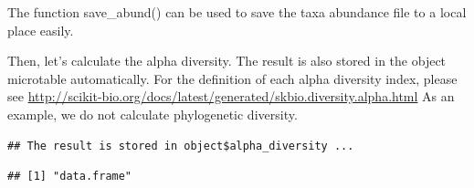 \documentclass[
]{book}
\newenvironment{Shaded}{\begin{snugshade}}{\end{snugshade}}
\newcommand{\AttributeTok}[1]{\textcolor[rgb]{0.77,0.63,0.00}{#1}}
\newcommand{\CommentTok}[1]{\textcolor[rgb]{0.56,0.35,0.01}{\textit{#1}}}
\newcommand{\ConstantTok}[1]{\textcolor[rgb]{0.00,0.00,0.00}{#1}}
\newcommand{\FunctionTok}[1]{\textcolor[rgb]{0.00,0.00,0.00}{#1}}
\newcommand{\NormalTok}[1]{#1}
\newcommand{\SpecialCharTok}[1]{\textcolor[rgb]{0.00,0.00,0.00}{#1}}
\newcommand{\StringTok}[1]{\textcolor[rgb]{0.31,0.60,0.02}{#1}}
\begin{document}
The function save\_abund() can be used to save the taxa abundance file to a local place easily.

\begin{Shaded}
\end{Shaded}

Then, let's calculate the alpha diversity.
The result is also stored in the object microtable automatically.
For the definition of each alpha diversity index, please see \url{http://scikit-bio.org/docs/latest/generated/skbio.diversity.alpha.html}
As an example, we do not calculate phylogenetic diversity.

\begin{Shaded}
\end{Shaded}

\begin{verbatim}
## The result is stored in object$alpha_diversity ...
\end{verbatim}

\begin{Shaded}
\end{Shaded}

\begin{verbatim}
## [1] "data.frame"
\end{verbatim}

\begin{Shaded}
\end{Shaded}
\end{document}
